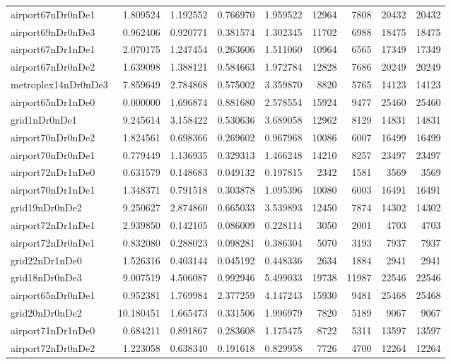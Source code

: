 \begin{longtable}{|l|r|r|r|r|r|r|r|r|}
airport67nDr0nDe1 & 1.809524 & 1.192552 & 0.766970 & 1.959522 & 12964 & 7808 & 20432 & 20432 \\
airport69nDr0nDe3 & 0.962406 & 0.920771 & 0.381574 & 1.302345 & 11702 & 6988 & 18475 & 18475 \\
airport67nDr1nDe1 & 2.070175 & 1.247454 & 0.263606 & 1.511060 & 10964 & 6565 & 17349 & 17349 \\
airport67nDr0nDe2 & 1.639098 & 1.388121 & 0.584663 & 1.972784 & 12828 & 7686 & 20249 & 20249 \\
metroplex14nDr0nDe3 & 7.859649 & 2.784868 & 0.575002 & 3.359870 & 8820 & 5765 & 14123 & 14123 \\
airport65nDr1nDe0 & 0.000000 & 1.696874 & 0.881680 & 2.578554 & 15924 & 9477 & 25460 & 25460 \\
grid1nDr0nDe1 & 9.245614 & 3.158422 & 0.530636 & 3.689058 & 12962 & 8129 & 14831 & 14831 \\
airport70nDr0nDe2 & 1.824561 & 0.698366 & 0.269602 & 0.967968 & 10086 & 6007 & 16499 & 16499 \\
airport70nDr0nDe1 & 0.779449 & 1.136935 & 0.329313 & 1.466248 & 14210 & 8257 & 23497 & 23497 \\
airport72nDr1nDe0 & 0.631579 & 0.148683 & 0.049132 & 0.197815 & 2342 & 1581 & 3569 & 3569 \\
airport70nDr1nDe1 & 1.348371 & 0.791518 & 0.303878 & 1.095396 & 10080 & 6003 & 16491 & 16491 \\
grid19nDr0nDe2 & 9.250627 & 2.874860 & 0.665033 & 3.539893 & 12450 & 7874 & 14302 & 14302 \\
airport72nDr1nDe1 & 2.939850 & 0.142105 & 0.086009 & 0.228114 & 3050 & 2001 & 4703 & 4703 \\
airport72nDr0nDe1 & 0.832080 & 0.288023 & 0.098281 & 0.386304 & 5070 & 3193 & 7937 & 7937 \\
grid22nDr1nDe0 & 1.526316 & 0.403144 & 0.045192 & 0.448336 & 2634 & 1884 & 2941 & 2941 \\
grid18nDr0nDe3 & 9.007519 & 4.506087 & 0.992946 & 5.499033 & 19738 & 11987 & 22546 & 22546 \\
airport65nDr0nDe1 & 0.952381 & 1.769984 & 2.377259 & 4.147243 & 15930 & 9481 & 25468 & 25468 \\
grid20nDr0nDe2 & 10.180451 & 1.665473 & 0.331506 & 1.996979 & 7820 & 5189 & 9067 & 9067 \\
airport71nDr1nDe0 & 0.684211 & 0.891867 & 0.283608 & 1.175475 & 8722 & 5311 & 13597 & 13597 \\
airport72nDr0nDe2 & 1.223058 & 0.638340 & 0.191618 & 0.829958 & 7726 & 4700 & 12264 & 12264 \\

\end{longtable}

